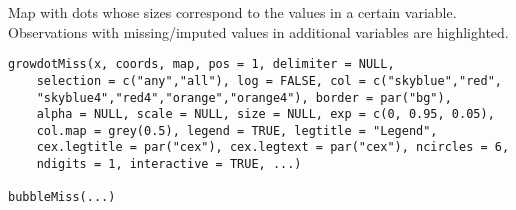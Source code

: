 %
\begin{Description}\relax
Map with dots whose sizes correspond to the values in a certain
variable.  Observations with missing/imputed values in additional variables 
are highlighted.
\end{Description}
%
\begin{Usage}
\begin{verbatim}
growdotMiss(x, coords, map, pos = 1, delimiter = NULL,
    selection = c("any","all"), log = FALSE, col = c("skyblue","red",
    "skyblue4","red4","orange","orange4"), border = par("bg"),
    alpha = NULL, scale = NULL, size = NULL, exp = c(0, 0.95, 0.05),
    col.map = grey(0.5), legend = TRUE, legtitle = "Legend",
    cex.legtitle = par("cex"), cex.legtext = par("cex"), ncircles = 6,
    ndigits = 1, interactive = TRUE, ...)

bubbleMiss(...)
\end{verbatim}
\end{Usage}
%
